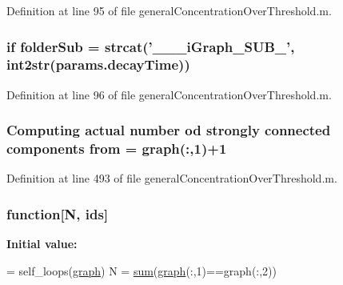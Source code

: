 Definition at line 95 of file general\-Concentration\-Over\-Threshold.\-m.

\hypertarget{a00022_a05c5bf0305e5d58d4dc25bd89a025678}{
\subsubsection[{folder\-Sub}]{ {\bf if} folder\-Sub = strcat('\-\_\-\-\_\-\_\-i\-Graph\-\_\-\-S\-U\-B\-\_\-', int2str({\bf params.\-decay\-Time}))}}\label{a00022_a05c5bf0305e5d58d4dc25bd89a025678}


Definition at line 96 of file general\-Concentration\-Over\-Threshold.\-m.

\hypertarget{a00022_aa7b4fe13e75a69fca72862effeaf6196}{
\subsubsection[{from}]{\setlength{\rightskip}{0pt plus 5cm}Computing actual number od strongly connected components from = {\bf graph}(\-:,1)+1}}\label{a00022_aa7b4fe13e75a69fca72862effeaf6196}


Definition at line 493 of file general\-Concentration\-Over\-Threshold.\-m.

\hypertarget{a00022_af12e4ac3392d0671e386d46e2424a06a}{
\subsubsection[{function}]{ function\mbox{[}N, {\bf ids}\mbox{]}}}\label{a00022_af12e4ac3392d0671e386d46e2424a06a}
{\bfseries Initial value\-:}
\begin{DoxyCode}
= self\_loops(\hyperlink{a00022_a91819eaefb434ac459f17b3caa03713d}{graph})
    N = \hyperlink{a00022_a576bebae86b11914280920c448def53d}{sum}(\hyperlink{a00022_a91819eaefb434ac459f17b3caa03713d}{graph}(:,1)==graph(:,2))
\end{DoxyCode}


